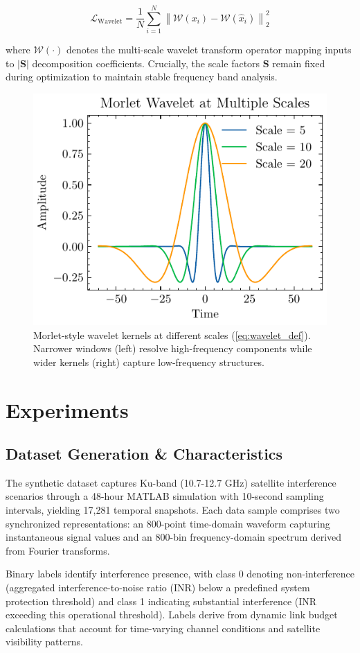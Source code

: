 \documentclass[12pt]{article}
\begin{document}
\begin{equation}
    \mathcal{L}_{\text{Wavelet}} = \frac{1}{N}\sum_{i=1}^{N} \left\lVert \mathcal{W}(x_i) - \mathcal{W}(\hat{x}_i) \right\rVert_2^2
    \label{eq:wavelet_loss}
\end{equation}

where $\mathcal{W}(\cdot)$ denotes the multi-scale wavelet transform operator mapping inputs to $|\mathbf{S}|$ decomposition coefficients. Crucially, the scale factors $\mathbf{S}$ remain fixed during optimization to maintain stable frequency band analysis.



\begin{figure}[t]
    \centering
    \includegraphics[width=0.5\linewidth]{wavelet-scales.pdf}
    \caption{Morlet-style wavelet kernels at different scales (\autoref{eq:wavelet_def}). Narrower windows (left) resolve high-frequency components while wider kernels (right) capture low-frequency structures.}
    \label{fig:wavelet_scales}
\end{figure}

\section{Experiments}

\subsection{Dataset Generation \& Characteristics}
\label{sec:dataset}

The synthetic dataset captures Ku-band (10.7-12.7 GHz) satellite interference scenarios through a 48-hour MATLAB simulation with 10-second sampling intervals, yielding 17,281 temporal snapshots. Each data sample comprises two synchronized representations: an 800-point time-domain waveform capturing instantaneous signal values and an 800-bin frequency-domain spectrum derived from Fourier transforms.

Binary labels identify interference presence, with class 0 denoting non-interference (aggregated interference-to-noise ratio (INR) below a predefined system protection threshold) and class 1 indicating substantial interference (INR exceeding this operational threshold). Labels derive from dynamic link budget calculations that account for time-varying channel conditions and satellite visibility patterns.
\end{document}
